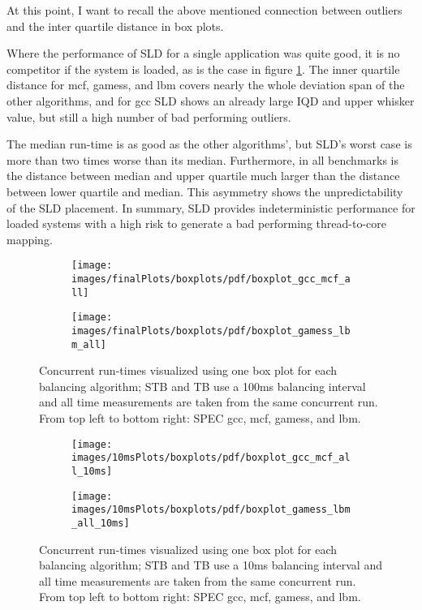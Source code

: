 At this point, I want to recall the above mentioned connection between outliers
and the inter quartile distance in box plots.

Where the performance of SLD for a single application was quite good, it is
no competitor if the system is loaded, as is the case in figure
\ref{eval:fig:box_all}.
The inner quartile distance for mcf, gamess, and lbm covers nearly the whole
deviation span of the other algorithms, and for gcc SLD shows an already large
IQD and upper whisker value, but still a high number of bad performing outliers.

The median run-time is as good as the other algorithms', but SLD's worst case
is more than two times worse than its median.
Furthermore, in all benchmarks is the distance between median and upper quartile
much larger than the distance between lower quartile and median.
This asymmetry shows the unpredictability of the SLD placement.
In summary, SLD provides indeterministic performance for loaded systems with a
high risk to generate a bad performing thread-to-core mapping.
%
\begin{figure}[h!]
  \begin{subfigure}{\textwidth}
  \texttt{[image: images/finalPlots/boxplots/pdf/boxplot\_gcc\_mcf\_all]}
  \end{subfigure}
  \begin{subfigure}{\textwidth}
  \texttt{[image: images/finalPlots/boxplots/pdf/boxplot\_gamess\_lbm\_all]}
  \end{subfigure}
  \caption{Concurrent run-times visualized using one box plot for each balancing
    algorithm; STB and TB use a 100ms balancing interval and all time
    measurements are taken from the same concurrent run.
    From top left to bottom right: SPEC gcc, mcf, gamess, and lbm.
    }
    \label{eval:fig:box_all}
\end{figure}
%
\begin{figure}[!ht]
  \begin{subfigure}{\textwidth}
  \texttt{[image: images/10msPlots/boxplots/pdf/boxplot\_gcc\_mcf\_all\_10ms]}
  \end{subfigure}
  \begin{subfigure}{\textwidth}
  \texttt{[image: images/10msPlots/boxplots/pdf/boxplot\_gamess\_lbm\_all\_10ms]}
  \end{subfigure}
  \caption{Concurrent run-times visualized using one box plot for each balancing
    algorithm; STB and TB use a 10ms balancing interval and all time
    measurements are taken from the same concurrent run.
    From top left to bottom right: SPEC gcc, mcf, gamess, and lbm.
    }
  \label{eval:fig:box_all_10ms}
\end{figure}
\\


